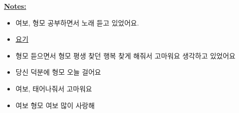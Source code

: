 \documentclass[12pt]{article}
\begin{document}
\bigskip

\underline{\textbf{Notes:}}

\bigskip

\begin{itemize}
    \item 여보, 형모 공부하면서 노래 듣고 있었어요.
    \item \href{https://www.youtube.com/watch?v=Eh9JU_l7yN0}{요기}
    \item 형모 듣으면서 형모 평생 찾던 행복 찾게 해줘서 고마워요 생각하고 있었어요
    \item 당신 덕분에 형모 오늘 걸어요
    \item 여보, 태어나줘서 고마워요
    \item 여보 형모 여보 많이 사랑해
\end{itemize}
\end{document}
